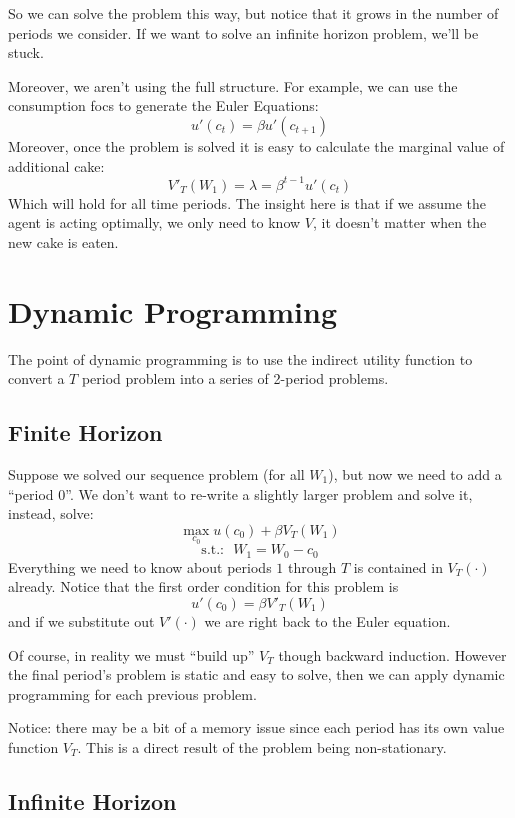 \documentclass[twoside]{article}
\begin{document}
So we can solve the problem this way, but notice that it grows in the number of periods we consider.  If we want to solve an infinite horizon problem, we'll 
be stuck.  

Moreover, we aren't using the full structure. For example, we can use the consumption focs to generate the Euler Equations: 
$$ u'(c_t) = \beta u'(c_{t+1})$$
Moreover, once the problem is solved it is easy to calculate the marginal value of additional cake: 
$$ V'_T(W_1) = \lambda = \beta^{t-1}u'(c_t) $$ 
Which will hold for all time periods. The insight here is that if we assume the agent is acting optimally, we only need to know $V$, it doesn't matter when the
new cake is eaten. 

\section{Dynamic Programming}

The point of dynamic programming is to use the indirect utility function to convert a $T$ period problem into a series of 2-period problems. 

\subsection{Finite Horizon}

Suppose we solved our sequence problem (for all $W_1$), but now we need to add a ``period 0''. We don't want to re-write a slightly larger problem and solve it, instead, solve: 
$$ \max_{c_0} u(c_0) + \beta V_T(W_1) $$
$$\mbox{s.t.:~~} W_1 = W_0 - c_0$$
Everything we need to know about periods $1$ through $T$ is contained in $V_T(\cdot)$ already.  Notice that the first order condition for this problem is
$$u'(c_0) = \beta V'_T(W_1)$$
and if we substitute out $V'(\cdot)$ we are right back to the Euler equation.

Of course, in reality we must ``build up'' $V_T$ though backward induction. However the final period's problem is static and easy to solve, then we can apply dynamic programming for each previous problem. 

Notice: there may be a bit of a memory issue since each period has its own value function $V_T$. This is a direct result of the problem being non-stationary. 

\subsection{Infinite Horizon}
\end{document}
